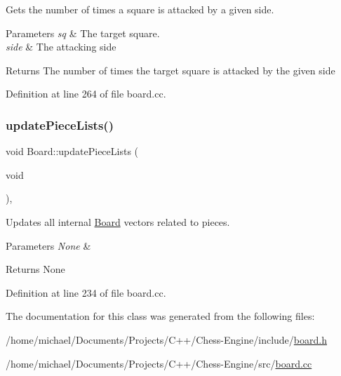 Gets the number of times a square is attacked by a given side. 


\begin{DoxyParams}{Parameters}
{\em sq} & The target square. \\
\hline
{\em side} & The attacking side \\
\hline
\end{DoxyParams}
\begin{DoxyReturn}{Returns}
The number of times the target square is attacked by the given side 
\end{DoxyReturn}


Definition at line 264 of file board.\+cc.

\mbox{\label{classBoard_a2b86adf733a5509848f0cc689be49866}} 
\subsubsection{\texorpdfstring{update\+Piece\+Lists()}{updatePieceLists()}}
{\footnotesize\ttfamily void Board\+::update\+Piece\+Lists (\begin{DoxyParamCaption}\item[{void}]{ }\end{DoxyParamCaption})\hspace{0.3cm}{\ttfamily [private]}, {\ttfamily [noexcept]}}



Updates all internal \mbox{\hyperlink{classBoard}{Board}} vectors related to pieces. 


\begin{DoxyParams}{Parameters}
{\em None} & \\
\hline
\end{DoxyParams}
\begin{DoxyReturn}{Returns}
None 
\end{DoxyReturn}


Definition at line 234 of file board.\+cc.



The documentation for this class was generated from the following files\+:\begin{DoxyCompactItemize}
\item 
/home/michael/\+Documents/\+Projects/\+C++/\+Chess-\/\+Engine/include/\mbox{\hyperlink{board_8h}{board.\+h}}\item 
/home/michael/\+Documents/\+Projects/\+C++/\+Chess-\/\+Engine/src/\mbox{\hyperlink{board_8cc}{board.\+cc}}\end{DoxyCompactItemize}
